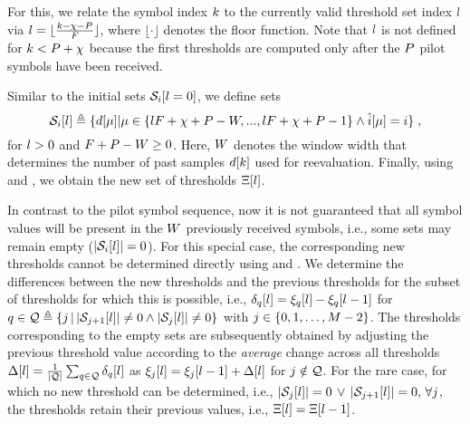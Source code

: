 For this, we relate the symbol index $k$ to the currently valid threshold set index $l$ via $l = \lfloor \frac{k-\chi-P}{F}\rfloor$, where $\lfloor \cdot \rfloor$ denotes the floor function. Note that $l$ is not defined for $k < P + \chi$ because the first thresholds are computed only after the $P$ pilot symbols have been received.

Similar to the initial sets $\mathcal{S}_i[l = 0]$, we define sets
\begin{equation}
    \mathcal{S}_i[l]\triangleq\{d[\mu]|\mu \in \{lF+\chi+P-W,..., lF+\chi+P-1\} \wedge \hat{{i}}[\mu]=i\}\;,
    \label{eq:sampleSets}
\end{equation}
for $l>0$ and $F+P-W \geq 0$. Here, $W$ denotes the window width that determines the number of past samples $d[k]$ used for reevaluation. Finally, using  and , we obtain the new set of thresholds $\Xi[l]$.

In contrast to the pilot symbol sequence, now it is not guaranteed that all symbol values will be present in the $W$ previously received symbols, i.e., some sets may remain empty ($|\mathcal{S}_i[l]| = 0$). For this special case, the corresponding new thresholds cannot be determined directly using  and . We determine the differences between the new thresholds and the previous thresholds for the subset of thresholds for which this is possible, i.e., $\delta_q[l] =\xi_q[l] - \xi_q[l-1]$ for $q \in \mathcal{Q}\triangleq\{j \,|\,|\mathcal{S}_{j+1}[l]|\neq0 \wedge |\mathcal{S}_{j}[l]|\neq 0\}$ with $j \in \{0, 1, \hdots, M-2\}$. The thresholds corresponding to the empty sets are subsequently obtained by adjusting the previous threshold value according to the \textit{average} change across all thresholds $\Delta[l] = \frac{1}{|\mathcal{Q}|}\sum_{q \in \mathcal{Q}}\delta_q[l]$ as $\xi_j[l] = \xi_j[l-1] + \Delta[l]$ for $j \notin \mathcal{Q}$. For the rare case, for which no new threshold can be determined, i.e., $|\mathcal{S}_{j}[l]|=0 \,\vee\, |\mathcal{S}_{j+1}[l]|=0,\,\forall j$, the thresholds retain their previous values, i.e., $\Xi[l]=\Xi[l-1]$.